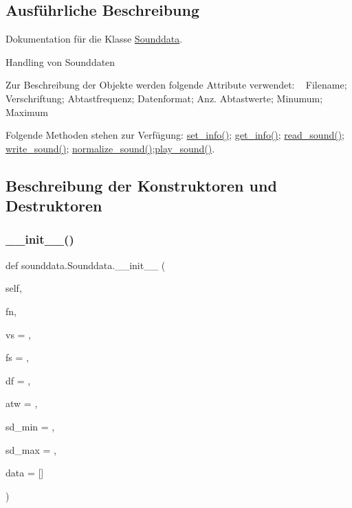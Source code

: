 \subsection{Ausführliche Beschreibung}
Dokumentation für die Klasse \mbox{\hyperlink{classsounddata_1_1_sounddata}{Sounddata}}. 

Handling von Sounddaten

Zur Beschreibung der Objekte werden folgende Attribute verwendet\+: ~\newline
 Filename; Verschriftung; Abtastfrequenz; Datenformat; Anz. Abtastwerte; Minumum; Maximum

Folgende Methoden stehen zur Verfügung\+: \mbox{\hyperlink{classsounddata_1_1_sounddata_a198de54d49c935b70cf8545980af1c26}{set\+\_\+info()}}; \mbox{\hyperlink{classsounddata_1_1_sounddata_ac63cbec499bc5b28eced6ff6d0187376}{get\+\_\+info()}}; \mbox{\hyperlink{classsounddata_1_1_sounddata_a88a9e2052bdaa80e988bb0d4f5610495}{read\+\_\+sound()}}; \mbox{\hyperlink{classsounddata_1_1_sounddata_abcf4edd6915714cc4db89ab787ab4007}{write\+\_\+sound()}}; \mbox{\hyperlink{classsounddata_1_1_sounddata_a623c2b2a5e126347893864ffc09246d6}{normalize\+\_\+sound()}};\mbox{\hyperlink{classsounddata_1_1_sounddata_aacf5b956e13132ce48a550852b6e9a96}{play\+\_\+sound()}}. 

\subsection{Beschreibung der Konstruktoren und Destruktoren}
\mbox{\label{classsounddata_1_1_sounddata_a5bd8d7eebdf0bb0d137bfeb74b4c9fe6}} 
\subsubsection{\texorpdfstring{\+\_\+\+\_\+init\+\_\+\+\_\+()}{\_\_init\_\_()}}
{\footnotesize\ttfamily def sounddata.\+Sounddata.\+\_\+\+\_\+init\+\_\+\+\_\+ (\begin{DoxyParamCaption}\item[{}]{self,  }\item[{}]{fn,  }\item[{}]{vs = {\ttfamily \textquotesingle{}\textquotesingle{}},  }\item[{}]{fs = {},  }\item[{}]{df = {\ttfamily \textquotesingle{}\textquotesingle{}},  }\item[{}]{atw = {},  }\item[{}]{sd\+\_\+min = {},  }\item[{}]{sd\+\_\+max = {},  }\item[{}]{data = {\ttfamily \mbox{[}\mbox{]}} }\end{DoxyParamCaption})}




